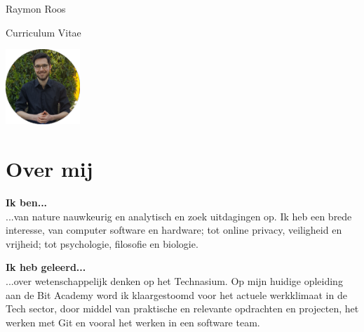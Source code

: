 \documentclass[
	11pt, %
]{FreemanCV}
\begin{document}
\begin{paracol}{2} %

	\parbox[][0.25\textheight][c]{\linewidth}{ %
		\centering %
		{\sffamily\Huge Raymon Roos} %
		\medskip %

		\vspace{-5pt}
		{\cursivefont\Large\textcolor{headings}{Curriculum Vitae}}

		\begin{center}
			\includegraphics[width=0.21\textwidth,origin=c]{me_myself.jpg}
		\end{center}
		\vspace{-15pt}
	}

	\section{Over mij}

	\textbf{Ik ben...}\\
	...van nature nauwkeurig en analytisch en zoek uitdagingen op. Ik heb een brede 
	interesse, van computer software en hardware; tot online privacy, veiligheid en 
	vrijheid; tot psychologie, filosofie en biologie.

	\textbf{Ik heb geleerd...}\\
	...over wetenschappelijk denken op het Technasium. Op mijn huidige opleiding aan de 
	Bit Academy word ik klaargestoomd voor het actuele werkklimaat in de Tech sector, door 
	middel van praktische en relevante opdrachten en projecten, het werken met Git en 
	vooral het werken in een software team. 


\end{paracol}
\end{document}
